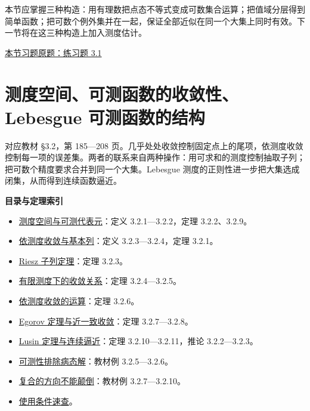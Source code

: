 \documentclass[11pt,a4paper]{article}
\providecommand{\tightlist}{\setlength{\itemsep}{3pt}\setlength{\parskip}{0pt}}
\begin{document}
本节应掌握三种构造：用有理数把点态不等式变成可数集合运算；把值域分层得到简单函数；把可数个例外集并在一起，保证全部近似在同一个大集上同时有效。下一节将在这三种构造上加入测度估计。

\noindent\hyperlink{ex1}{本节习题原题：练习题 3.1}

\section{测度空间、可测函数的收敛性、Lebesgue 可测函数的结构}
对应教材 §3.2，第 185---208
页。几乎处处收敛控制固定点上的尾项，依测度收敛控制每一项的误差集。两者的联系来自两种操作：用可求和的测度控制抽取子列；把可数个精度要求合并到同一个大集。Lebesgue
测度的正则性进一步把大集选成闭集，从而得到连续函数逼近。

\textbf{目录与定理索引}

\begin{itemize}
\tightlist
\item
  \hyperref[ux6d4bux5ea6ux7a7aux95f4ux4e0eux53efux6d4bux4ee3ux8868ux5143]{测度空间与可测代表元}：定义
  3.2.1---3.2.2，定理 3.2.2、3.2.9。
\item
  \hyperref[ux4f9dux6d4bux5ea6ux6536ux655bux4e0eux57faux672cux5217]{依测度收敛与基本列}：定义
  3.2.3---3.2.4，定理 3.2.1。
\item
  \hyperref[riesz-ux5b50ux5217ux5b9aux7406]{Riesz 子列定理}：定理
  3.2.3。
\item
  \hyperref[ux6709ux9650ux6d4bux5ea6ux4e0bux7684ux6536ux655bux5173ux7cfb]{有限测度下的收敛关系}：定理
  3.2.4---3.2.5。
\item
  \hyperref[ux4f9dux6d4bux5ea6ux6536ux655bux7684ux8fd0ux7b97]{依测度收敛的运算}：定理
  3.2.6。
\item
  \hyperref[egorov-ux5b9aux7406ux4e0eux8fd1ux4e00ux81f4ux6536ux655b]{Egorov
  定理与近一致收敛}：定理 3.2.7---3.2.8。
\item
  \hyperref[lusin-ux5b9aux7406ux4e0eux8fdeux7eedux903cux8fd1]{Lusin
  定理与连续逼近}：定理 3.2.10---3.2.11，推论 3.2.2---3.2.3。
\item
  \hyperref[ux53efux6d4bux6027ux6392ux9664ux75c5ux6001ux89e3]{可测性排除病态解}：教材例
  3.2.5---3.2.6。
\item
  \hyperref[ux590dux5408ux7684ux65b9ux5411ux4e0dux80fdux98a0ux5012]{复合的方向不能颠倒}：教材例
  3.2.7---3.2.10。
\item
  \hyperref[ux4f7fux7528ux6761ux4ef6ux901fux67e5]{使用条件速查}。
\end{itemize}
\end{document}
